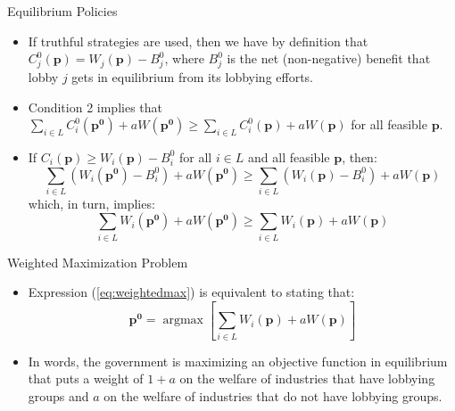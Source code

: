 \documentclass[aspectratio=169]{beamer}
\begin{document}
\begin{frame}{Equilibrium Policies}

\begin{itemize}
    \item<1-> If truthful strategies are used, then we have by definition that $ C_{j}^{0}\left( \mathbf{p} \right) = W_{j}\left( \mathbf{p} \right) - B_{j}^{0} $, where $ B_{j}^{0} $ is the net (non-negative) benefit that lobby $ j $ gets in equilibrium from its lobbying efforts.
    \item<2-> Condition 2 implies that $ \sum_{i \in L} C_{i}^{0}\left( \mathbf{p^{0}} \right) + a W\left( \mathbf{p^{0}} \right) \ge \sum_{i \in L} C_{i}^{0}\left( \mathbf{p} \right) + a W\left( \mathbf{p} \right) $ for all feasible $ \mathbf{p} $.
    \item<3-> If $ C_{i}\left( \mathbf{p} \right) \ge W_{i}\left( \mathbf{p} \right) - B_{i}^{0} $ for all $ i \in L $ and all feasible $ \mathbf{p} $, then:
    \begin{equation*}
        \sum_{i \in L}\left( W_{i}\left( \mathbf{p^{0}} \right) - B_{i}^{0} \right) + a W\left( \mathbf{p^{0}} \right) \ge \sum_{i \in L}\left( W_{i}\left( \mathbf{p} \right) - B_{i}^{0} \right) + a W\left( \mathbf{p} \right)
    \end{equation*}
    which, in turn, implies:
    \begin{equation}
        \sum_{i \in L} W_{i}\left( \mathbf{p^{0}} \right) + a W\left( \mathbf{p^{0}} \right) \ge \sum_{i \in L} W_{i}\left( \mathbf{p} \right) + a W\left( \mathbf{p} \right)
        \label{eq:weightedmax}
    \end{equation}
\end{itemize}
    
\end{frame}


\begin{frame}{Weighted Maximization Problem}

\begin{itemize}
    \item<1-> Expression (\ref{eq:weightedmax}) is equivalent to stating that:
    \begin{equation}
        \mathbf{p^{0}} = \operatorname{argmax} \left[ \sum_{i \in L} W_{i}\left( \mathbf{p} \right) + a W\left( \mathbf{p} \right) \right]
        \label{eq:weightedmax2}
    \end{equation}
    \item<2-> In words, the government is maximizing an objective function in equilibrium that puts a weight of $ 1 + a $ on the welfare of industries that have lobbying groups and $ a $ on the welfare of industries that do not have lobbying groups.
\end{itemize}
    
\end{frame}
\end{document}
